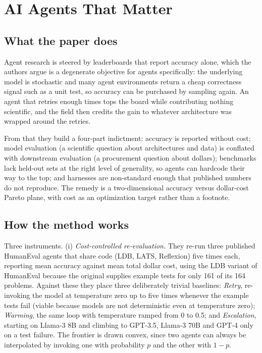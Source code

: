 \section{AI Agents That Matter}

\subsection{What the paper does}

Agent research is steered by leaderboards that report accuracy alone, which the authors argue is a degenerate objective for agents specifically: the underlying model is stochastic and many agent environments return a cheap correctness signal such as a unit test, so accuracy can be purchased by sampling again. An agent that retries enough times tops the board while contributing nothing scientific, and the field then credits the gain to whatever architecture was wrapped around the retries.

From that they build a four-part indictment: accuracy is reported without cost; model evaluation (a scientific question about architectures and data) is conflated with downstream evaluation (a procurement question about dollars); benchmarks lack held-out sets at the right level of generality, so agents can hardcode their way to the top; and harnesses are non-standard enough that published numbers do not reproduce. The remedy is a two-dimensional accuracy versus dollar-cost Pareto plane, with cost as an optimization target rather than a footnote.

\subsection{How the method works}

Three instruments. (i) \textit{Cost-controlled re-evaluation.} They re-run three published HumanEval agents that share code (LDB, LATS, Reflexion) five times each, reporting mean accuracy against mean total dollar cost, using the LDB variant of HumanEval because the original supplies example tests for only 161 of its 164 problems. Against these they place three deliberately trivial baselines: \textit{Retry}, re-invoking the model at temperature zero up to five times whenever the example tests fail (viable because models are not deterministic even at temperature zero); \textit{Warming}, the same loop with temperature ramped from 0 to 0.5; and \textit{Escalation}, starting on Llama-3 8B and climbing to GPT-3.5, Llama-3 70B and GPT-4 only on a test failure. The frontier is drawn convex, since two agents can always be interpolated by invoking one with probability $p$ and the other with $1-p$.


